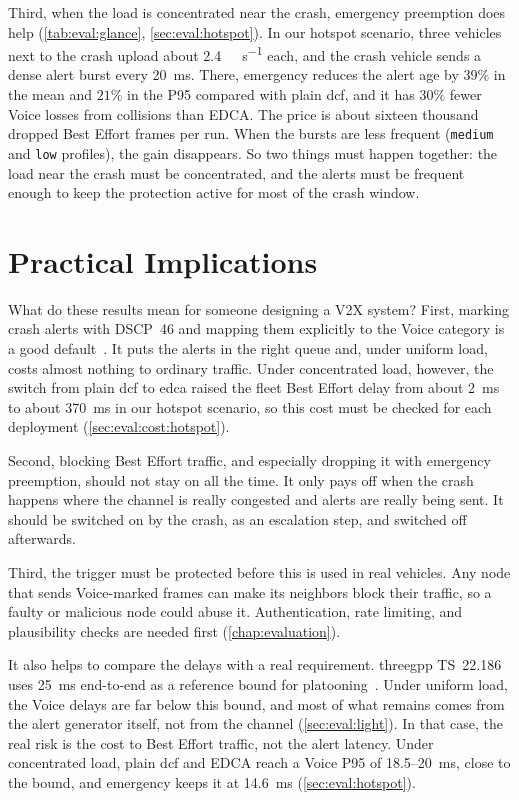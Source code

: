 Third, when the load is concentrated near the crash, emergency preemption does help (\autoref{tab:eval:glance}, \autoref{sec:eval:hotspot}).
In our hotspot scenario, three vehicles next to the crash upload about \SI{2.4}{\mega\bit\per\second} each, and the crash vehicle sends a dense alert burst every 20~ms.
There, emergency reduces the alert age by $39\%$ in the mean and $21\%$ in the P95 compared with plain \gls{dcf}, and it has $30\%$ fewer Voice losses from collisions than EDCA.
The price is about sixteen thousand dropped Best Effort frames per run.
When the bursts are less frequent (\texttt{medium} and \texttt{low} profiles), the gain disappears.
So two things must happen together: the load near the crash must be concentrated, and the alerts must be frequent enough to keep the protection active for most of the crash window.

\section{Practical Implications}
\label{sec:conc:takeaway}

What do these results mean for someone designing a V2X system?
First, marking crash alerts with DSCP~46 and mapping them explicitly to the Voice category is a good default~\cite{IEEE80211e_2005}.
It puts the alerts in the right queue and, under uniform load, costs almost nothing to ordinary traffic. Under concentrated load, however, the switch from plain \gls{dcf} to \gls{edca} raised the fleet Best Effort delay from about 2~ms to about 370~ms in our hotspot scenario, so this cost must be checked for each deployment (\autoref{sec:eval:cost:hotspot}).

Second, blocking Best Effort traffic, and especially dropping it with emergency preemption, should not stay on all the time.
It only pays off when the crash happens where the channel is really congested and alerts are really being sent.
It should be switched on by the crash, as an escalation step, and switched off afterwards.

Third, the trigger must be protected before this is used in real vehicles.
Any node that sends Voice-marked frames can make its neighbors block their traffic, so a faulty or malicious node could abuse it.
Authentication, rate limiting, and plausibility checks are needed first (\autoref{chap:evaluation}).

It also helps to compare the delays with a real requirement.
\gls{threegpp} TS~22.186 uses \SI{25}{\milli\second} end-to-end as a reference bound for platooning~\cite{ts22186}.
Under uniform load, the Voice delays are far below this bound, and most of what remains comes from the alert generator itself, not from the channel (\autoref{sec:eval:light}).
In that case, the real risk is the cost to Best Effort traffic, not the alert latency.
Under concentrated load, plain \gls{dcf} and EDCA reach a Voice P95 of 18.5--20~ms, close to the bound, and emergency keeps it at 14.6~ms (\autoref{sec:eval:hotspot}).

